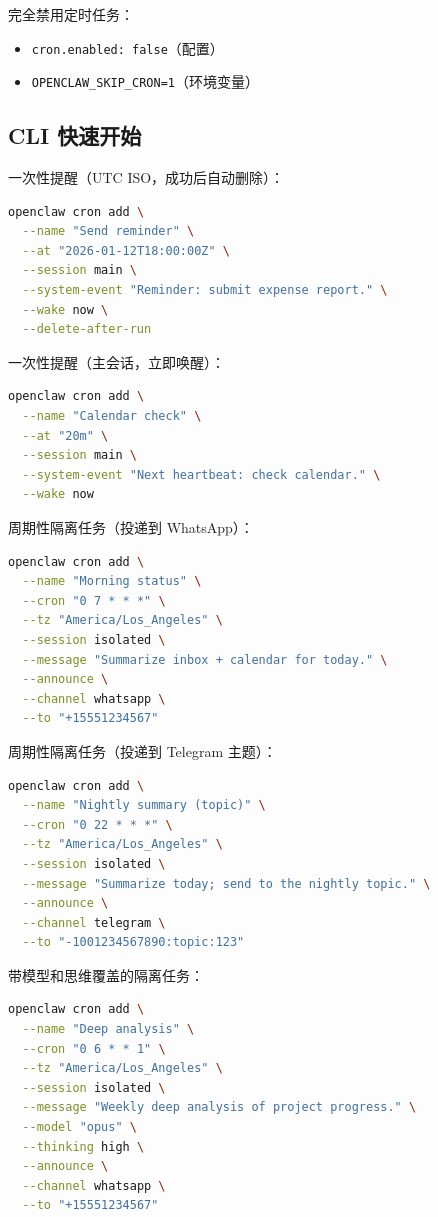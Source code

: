 完全禁用定时任务：

\begin{itemize}
  \item \texttt{cron.enabled: false}（配置）
  \item \texttt{OPENCLAW\_SKIP\_CRON=1}（环境变量）
\end{itemize}


\subsection{CLI 快速开始}


一次性提醒（UTC ISO，成功后自动删除）：

\begin{lstlisting}[language=bash]
openclaw cron add \
  --name "Send reminder" \
  --at "2026-01-12T18:00:00Z" \
  --session main \
  --system-event "Reminder: submit expense report." \
  --wake now \
  --delete-after-run
\end{lstlisting}


一次性提醒（主会话，立即唤醒）：

\begin{lstlisting}[language=bash]
openclaw cron add \
  --name "Calendar check" \
  --at "20m" \
  --session main \
  --system-event "Next heartbeat: check calendar." \
  --wake now
\end{lstlisting}


周期性隔离任务（投递到 WhatsApp）：

\begin{lstlisting}[language=bash]
openclaw cron add \
  --name "Morning status" \
  --cron "0 7 * * *" \
  --tz "America/Los_Angeles" \
  --session isolated \
  --message "Summarize inbox + calendar for today." \
  --announce \
  --channel whatsapp \
  --to "+15551234567"
\end{lstlisting}


周期性隔离任务（投递到 Telegram 主题）：

\begin{lstlisting}[language=bash]
openclaw cron add \
  --name "Nightly summary (topic)" \
  --cron "0 22 * * *" \
  --tz "America/Los_Angeles" \
  --session isolated \
  --message "Summarize today; send to the nightly topic." \
  --announce \
  --channel telegram \
  --to "-1001234567890:topic:123"
\end{lstlisting}


带模型和思维覆盖的隔离任务：

\begin{lstlisting}[language=bash]
openclaw cron add \
  --name "Deep analysis" \
  --cron "0 6 * * 1" \
  --tz "America/Los_Angeles" \
  --session isolated \
  --message "Weekly deep analysis of project progress." \
  --model "opus" \
  --thinking high \
  --announce \
  --channel whatsapp \
  --to "+15551234567"
\end{lstlisting}



